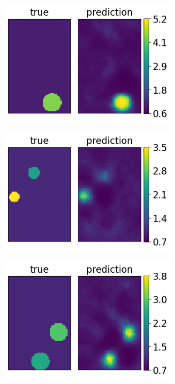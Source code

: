 \documentclass[12pt]{article}
\newcommand{\nhgappwidth}{0.24\linewidth}
\newcommand{\nhgappheight}{2.9cm}
\begin{document}
\begin{appendices}
\begin{figure}[!h]
\begin{subfigure}[c]{\nhgappwidth}
  \end{subfigure}
  \begin{subfigure}[c]{\nhgappwidth}
    \centering
    \includegraphics[totalheight=\nhgappheight]{Figures/AppendixNew/CNN2/ex7/mu.png}
  \end{subfigure}
  \begin{subfigure}[c]{\nhgappwidth}
    \centering
    \includegraphics[totalheight=\nhgappheight]{Figures/AppendixNew/CNN2/ex8/mu.png}
  \end{subfigure}
    \begin{subfigure}[c]{\nhgappwidth}
    \centering    
    \includegraphics[totalheight=\nhgappheight]{Figures/AppendixNew/CNN2/ex9/mu.png}

\end{subfigure}
\end{figure}
\end{appendices}
\end{document}

